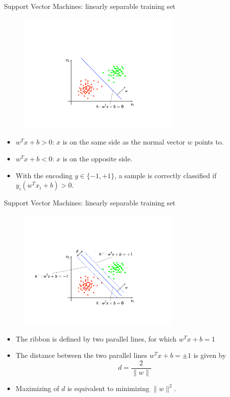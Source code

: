 \documentclass[xcolor=pdftex,dvipsnames,table]{beamer}
\begin{document}
\begin{frame}{Support Vector Machines: linearly separable training set}
	\begin{figure}[htb]
		\includegraphics[width=0.7\textwidth]{../graphics/SVM_1a.pdf}
	\end{figure}
	\begin{itemize}
		\item $w^Tx + b  > 0$: $x$ is on the same side as the normal vector $w$ points to.
		\item $w^Tx + b  < 0$: $x$ is on the opposite side.
		\item With the encoding $y\in\{-1,+1\}$, a sample is correctly classified if $y_i(w^Tx_i + b) > 0$.
	\end{itemize}
\end{frame}

\begin{frame}{Support Vector Machines: linearly separable training set}
	\begin{figure}[htb]
		\includegraphics[width=0.7\textwidth]{../graphics/SVM2.pdf}
	\end{figure}
	\begin{itemize}
		\item The ribbon is defined by two parallel lines, for which $w^Tx + b = 1$ 
		\item The distance between the two parallel lines $w^Tx + b = \pm 1$ is given by
		\begin{equation}
			d = \frac{2}{\|w\|}
		\end{equation}
		\item Maximizing of $d$ is equivalent to minimizing $\|w\|^2$.
	\end{itemize}
\end{frame}
\end{document}
